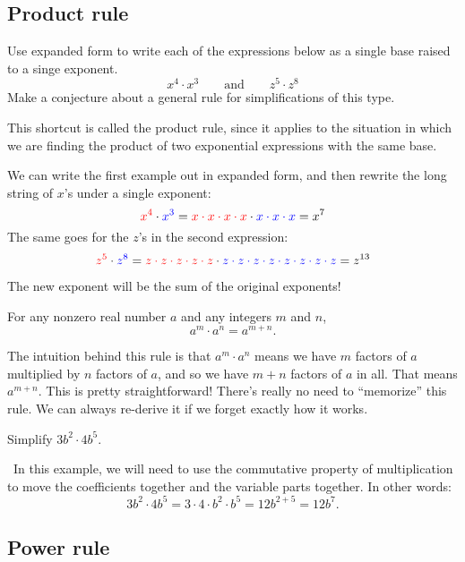 \subsection{Product rule}

\begin{boxexplore}[Derivation \#1]
Use expanded form to write each of the expressions below as a single base raised to a singe exponent.
\[x^4 \cdot x^3 \qquad\text{and}\qquad z^5 \cdot z^8\]
Make a conjecture about a general rule for simplifications of this type.
\end{boxexplore}

This shortcut is called the product rule, since it applies to the situation in which we are finding the product of two exponential expressions with the same base.

We can write the first example out in expanded form, and then rewrite the long string of $x$'s under a single exponent:
\[{\color{red}x^4} \cdot {\color{blue}x^3} = {\color{red}x \cdot x \cdot x \cdot x} \cdot {\color{blue}x \cdot x \cdot x} = x^7\]
The same goes for the $z$'s in the second expression:
\[{\color{red}z^5} \cdot {\color{blue}z^8} = {\color{red}z \cdot z \cdot z \cdot z \cdot z} \cdot {\color{blue}z \cdot z \cdot z \cdot z \cdot z \cdot z \cdot z \cdot z} = z^{13}\]

The new exponent will be the sum of the original exponents!

\begin{boxdef}
For any nonzero real number $a$ and any integers $m$ and $n$, \[a^m \cdot a^n = a^{m+n}.\]
\end{boxdef}

The intuition behind this rule is that $a^m \cdot a^n$ means we have $m$ factors of $a$ multiplied by $n$ factors of $a$, and so we have $m+n$ factors of $a$ in all. That means $a^{m+n}$. This is pretty straightforward! There's really no need to ``memorize'' this rule. We can always re-derive it if we forget exactly how it works.

\begin{boxex}
Simplify $3b^2 \cdot 4b^5.$

\exsoln\ In this example, we will need to use the commutative property of multiplication to move the coefficients together and the variable parts together. In other words: \[3b^2 \cdot 4b^5 = 3\cdot4\cdot b^2 \cdot b^5 = 12b^{2+5} = 12b^7.\]
\end{boxex}


\subsection{Power rule}


